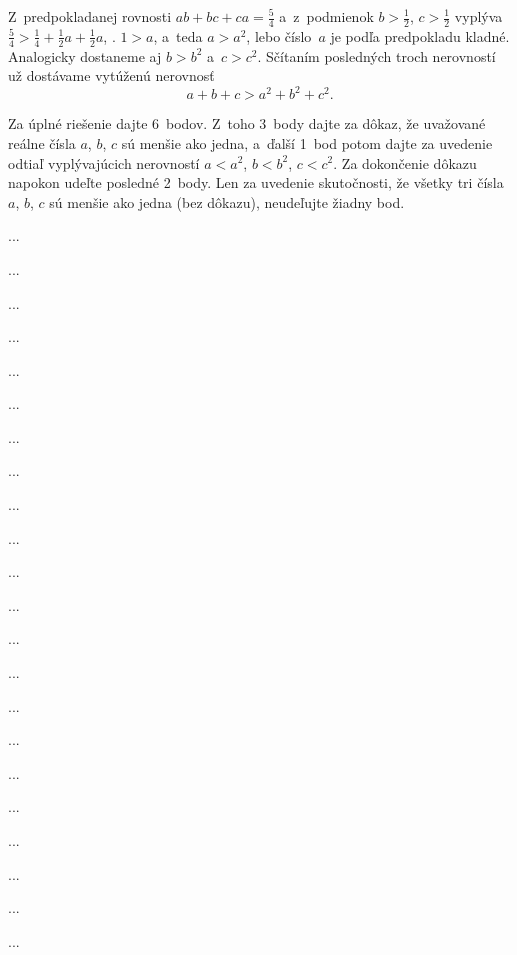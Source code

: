 {%
Z~predpokladanej rovnosti $ab+bc+ca=\frac54$ a~z~podmienok
$b>\frac12$, $c>\frac12$ vyplýva $\frac54>\frac14+\frac12a+\frac12a$,
\tj. $1>a$, a~teda $a>a^2$, lebo číslo~$a$ je podľa predpokladu kladné.
Analogicky dostaneme aj $b>b^2$ a~$c>c^2$.
Sčítaním posledných troch nerovností už dostávame vytúženú nerovnosť
$$
a+b+c>a^2+b^2+c^2.
$$

\nobreak\medskip\petit\noindent
Za úplné riešenie dajte 6~bodov. Z~toho 3~body
dajte za dôkaz, že uvažované reálne čísla $a$, $b$, $c$ sú menšie
ako jedna, a~ďalší 1~bod potom dajte za uvedenie odtiaľ vyplývajúcich
nerovností $a<a^2$, $b<b^2$, $c<c^2$. Za dokončenie dôkazu napokon udeľte
posledné 2~body. Len za uvedenie skutočnosti, že všetky tri čísla $a$, $b$,
$c$ sú menšie ako jedna (bez dôkazu), neudeľujte žiadny bod.
\endpetit
\bigbreak
}

{%
...}

{%
...}

{%
...}

{%
...}

{%
...}

{%
...}

{%
...}

{%
...}

{%
...}

{%
...}

{%
...}

{%
...}

{%
...}

{%
...}

{%
...}

{%
...}

{%
...}

{%
...}

{%
...}

{%
...}

{%
...}

{%
...}

